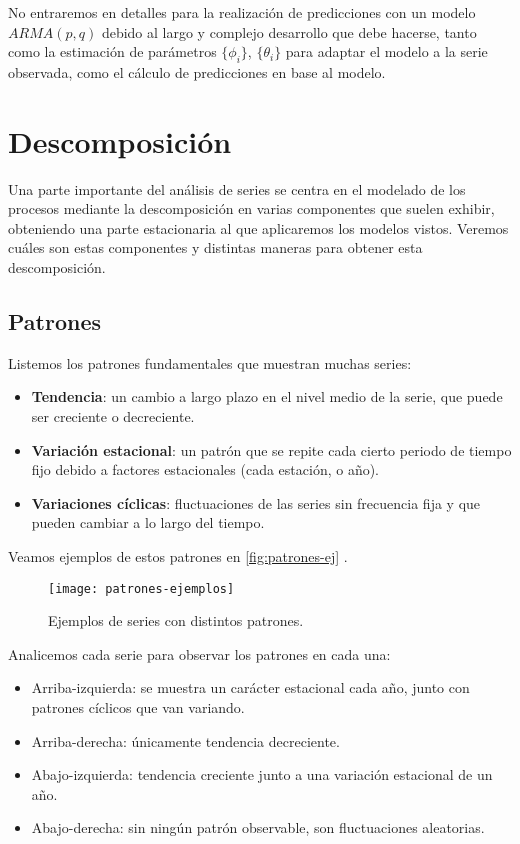No entraremos en detalles para la realización de predicciones con un modelo $ARMA(p,q)$ debido al largo y complejo desarrollo que debe hacerse, tanto como la estimación de parámetros $\{\phi_i\}$, $\{\theta_i\}$ para adaptar el modelo a la serie observada, como el cálculo de predicciones en base al modelo.

\section{Descomposición}

Una parte importante del análisis de series se centra en el modelado de los procesos mediante la descomposición en varias componentes que suelen exhibir, obteniendo una parte estacionaria al que aplicaremos los modelos vistos. Veremos cuáles son estas componentes y distintas maneras para obtener esta descomposición.

\subsection{Patrones}

Listemos los patrones fundamentales que muestran muchas series:

\begin{itemize}
  \item \textbf{Tendencia}: un cambio a largo plazo en el nivel medio de la serie, que puede ser creciente o decreciente.
  \item \textbf{Variación estacional}: un patrón que se repite cada cierto periodo de tiempo fijo debido a factores estacionales (cada estación, o año).
  \item \textbf{Variaciones cíclicas}: fluctuaciones de las series sin frecuencia fija y que pueden cambiar a lo largo del tiempo.
\end{itemize}

Veamos ejemplos de estos patrones en \autoref{fig:patrones-ej} \cite{hyndman2018forecasting}.

\begin{figure}[htpb]
  \centering
  \texttt{[image: patrones-ejemplos]}
  \caption{Ejemplos de series con distintos patrones.}
  \label{fig:patrones-ej}
\end{figure}

Analicemos cada serie para observar los patrones en cada una:

\begin{itemize}
  \item Arriba-izquierda: se muestra un carácter estacional cada año, junto con patrones cíclicos que van variando.
  \item Arriba-derecha: únicamente tendencia decreciente.
  \item Abajo-izquierda: tendencia creciente junto a una variación estacional de un año.
  \item Abajo-derecha: sin ningún patrón observable, son fluctuaciones aleatorias.
\end{itemize}

